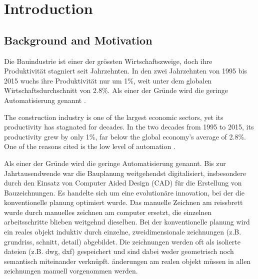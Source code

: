 \chapter{Introduction}
\label{sec:introduction}

\section{Background and Motivation}
\begin{German}
    Die Bauindustrie ist einer der grössten Wirtschaftszweige, doch ihre Produktivität stagniert seit Jahrzehnten. In den zwei Jahrzehnten von 1995 bis 2015 wuchs ihre Produktivität nur um 1\%, weit unter dem globalen Wirtschaftsdurchschnitt von 2.8\%. Als einer der Gründe wird die geringe Automatisierung genannt \cite{barbosaReinventingConstructionRoute2017}.
\end{German}
\begin{English}
    The construction industry is one of the largest economic sectors, yet its productivity has stagnated for decades. In the two decades from 1995 to 2015, its productivity grew by only 1\%, far below the global economy's average of 2.8\%. One of the reasons cited is the low level of automation \cite{barbosaReinventingConstructionRoute2017}.
\end{English}

\begin{German}
    Als einer der Gründe wird die geringe Automatisierung genannt. Bis zur Jahrtausendwende war die Bauplanung weitgehendst digitalisiert, insbesondere durch den Einsatz von Computer Aided Design (CAD) für die Erstellung von Bauzeichnungen. Es handelte sich um eine evolutionäre innovation, bei der die konventionelle planung optimiert wurde. Das manuelle Zeichnen am reissbrett wurde durch manuelles zeichnen am computer ersetzt, die einzelnen arbeitsschritte blieben weitgehnd dieselben. Bei der konventionelle planung wird ein reales objekt induktiv durch einzelne, zweidimensionale zeichnungen (z.B. grundriss, schnitt, detail) abgebildet. Die zeichnungen werden oft als isolierte dateien (z.B. dwg, dxf) gespeichert und sind dabei weder geometrisch noch semantisch miteinander verknüpft. änderungen am realen objekt müssen in allen zeichnungen manuell vorgenommen werden. \\
\end{German}

